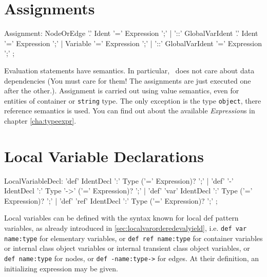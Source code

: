 \section{Assignments} \label{sub:assignments}

\begin{rail}
  Assignment:
	  NodeOrEdge '.' Ident '=' Expression ';' |
	  '::' GlobalVarIdent '.' Ident '=' Expression ';' |
	  Variable '=' Expression ';' |
	  '::' GlobalVarIdent '=' Expression ';'
	;
\end{rail}

Evaluation statements have  semantics.
In particular, \GrG\ does not care about data dependencies (You must care for them! The assignments are just executed one after the other.).
Assignment is carried out using value semantics, even for entities of container or \texttt{string} type.
The only exception is the type \texttt{object}, there reference semantics is used.
You can find out about the available \emph{Expression}s in chapter \ref{cha:typeexpr}.


\section{Local Variable Declarations} 

\begin{rail} 
  LocalVariableDecl: 
	'def' IdentDecl ':' Type ('=' Expression)? ';' |
	'def' '-' IdentDecl ':' Type '->' ('=' Expression)? ';' |
	'def' 'var' IdentDecl ':' Type ('=' Expression)? ';' |
	'def' 'ref' IdentDecl ':' Type ('=' Expression)? ';'
	;
\end{rail}

Local variables can be defined with the syntax known for local def pattern variables, as already introduced in \ref{sec:localvarorderedevalyield}, i.e. \texttt{def var name:type} for elementary variables, or \texttt{def ref name:type} for container variables or internal class object variables or internal transient class object variables, or \texttt{def name:type} for nodes, or \texttt{def -name:type->} for edges.
At their definition, an initializing expression may be given.

